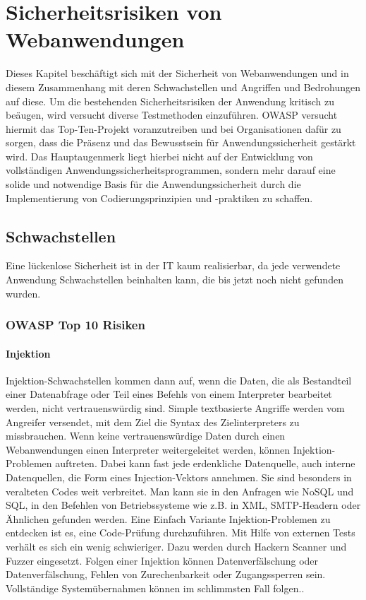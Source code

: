 \chapter{Sicherheitsrisiken von Webanwendungen}
\label{cha:k3}

Dieses Kapitel beschäftigt sich mit der Sicherheit von Webanwendungen und in diesem Zusammenhang mit deren Schwachstellen und Angriffen und Bedrohungen auf diese. Um die bestehenden Sicherheitsrisiken der Anwendung kritisch zu beäugen, wird versucht diverse Testmethoden einzuführen. OWASP versucht hiermit das Top-Ten-Projekt voranzutreiben und bei Organisationen dafür zu sorgen, dass die Präsenz und das Bewusstsein für Anwendungssicherheit gestärkt wird. Das Hauptaugenmerk liegt hierbei nicht auf der Entwicklung von vollständigen Anwendungssicherheitsprogrammen, sondern mehr darauf eine solide und notwendige Basis für die Anwendungssicherheit durch die Implementierung von Codierungsprinzipien und -praktiken zu schaffen.

\section{Schwachstellen}

Eine lückenlose Sicherheit ist in der IT kaum realisierbar, da jede verwendete Anwendung Schwachstellen beinhalten kann, die bis jetzt noch nicht gefunden wurden.

\subsection{OWASP Top 10 Risiken}

\subsubsection{Injektion}

Injektion-Schwachstellen kommen dann auf, wenn die Daten, die als Bestandteil einer Datenabfrage oder Teil eines Befehls von einem Interpreter bearbeitet werden, nicht vertrauenswürdig sind. Simple textbasierte Angriffe werden vom Angreifer versendet, mit dem Ziel die Syntax des Zielinterpreters zu missbrauchen. Wenn keine vertrauenswürdige Daten durch einen Webanwendungen einen Interpreter weitergeleitet werden, können Injektion-Problemen auftreten. Dabei kann fast jede erdenkliche Datenquelle, auch interne Datenquellen, die Form eines Injection-Vektors annehmen. Sie sind besonders in veralteten Codes weit verbreitet. Man kann sie in den Anfragen wie NoSQL und SQL, in den Befehlen von Betriebssysteme wie z.B. in XML, SMTP-Headern oder Ähnlichen gefunden werden. Eine Einfach Variante Injektion-Problemen zu entdecken ist es, eine Code-Prüfung durchzuführen. Mit Hilfe von externen Tests verhält es sich ein wenig schwieriger. Dazu werden durch Hackern Scanner und Fuzzer eingesetzt. Folgen einer Injektion können Datenverfälschung oder Datenverfälschung, Fehlen von Zurechenbarkeit oder Zugangssperren sein. Vollständige Systemübernahmen können im schlimmsten Fall folgen.\cite{owasp13top10}.\\

